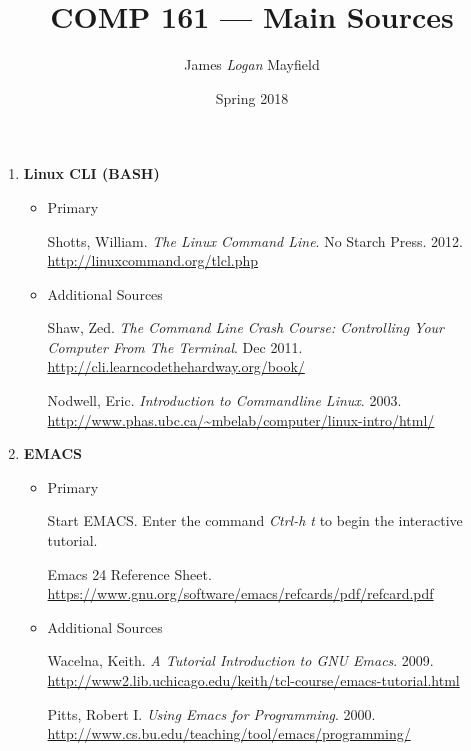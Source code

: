 \documentclass[10pt]{article}
\title{COMP 161 --- Main Sources}
\author{ James \textit{Logan} Mayfield }
\date{Spring 2018}
\begin{document}
\maketitle

\begin{enumerate}
\item \textbf{Linux CLI (BASH)}
\begin{itemize}
\item Primary

Shotts, William. \textit{The Linux Command Line}. No Starch Press. 2012.
\newline \url{http://linuxcommand.org/tlcl.php}

\vspace{.25in}

\item Additional Sources

Shaw, Zed. \textit{The Command Line Crash Course: Controlling Your Computer From The Terminal}. Dec 2011.
\newline \url{http://cli.learncodethehardway.org/book/}

\vspace{.25in}

Nodwell, Eric. \textit{Introduction to Commandline Linux}. 2003.
\newline \url{http://www.phas.ubc.ca/~mbelab/computer/linux-intro/html/}
\vspace{.25in}
\end{itemize}

\item \textbf{EMACS}
\begin{itemize}
\item Primary

Start EMACS\@. Enter the command \textit{Ctrl-h t} to begin the interactive tutorial.
\vspace{.25in}

Emacs 24 Reference Sheet. \newline
\url{https://www.gnu.org/software/emacs/refcards/pdf/refcard.pdf}
\vspace{.25in}

\item Additional Sources

Wacelna, Keith. \textit{A Tutorial Introduction to GNU Emacs}. 2009.
\newline \url{http://www2.lib.uchicago.edu/keith/tcl-course/emacs-tutorial.html}
\vspace{.25in}

Pitts, Robert I. \textit{Using Emacs for Programming}. 2000.
\newline \url{http://www.cs.bu.edu/teaching/tool/emacs/programming/}
\vspace{.25in}


\end{itemize}
\end{enumerate}
\end{document}
